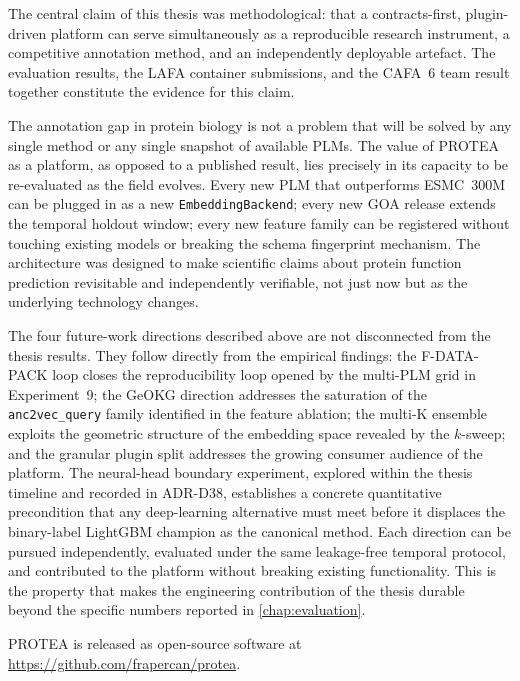The central claim of this thesis was methodological: that a contracts-first,
plugin-driven platform can serve simultaneously as a reproducible research
instrument, a competitive annotation method, and an independently deployable
artefact. The evaluation results, the LAFA container submissions, and the CAFA~6
team result together constitute the evidence for this claim.

The annotation gap in protein biology is not a problem that will be solved by
any single method or any single snapshot of available PLMs. The value of
PROTEA as a platform, as opposed to a published result, lies precisely in its
capacity to be re-evaluated as the field evolves. Every new PLM that outperforms
ESMC~300M can be plugged in as a new \texttt{EmbeddingBackend}; every new GOA
release extends the temporal holdout window; every new feature family can be
registered without touching existing models or breaking the schema fingerprint
mechanism. The architecture was designed to make scientific claims about protein
function prediction revisitable and independently verifiable, not just now but
as the underlying technology changes.

The four future-work directions described above are not disconnected from the
thesis results. They follow directly from the empirical findings: the
F-DATA-PACK loop closes the reproducibility loop opened by the multi-PLM
grid in Experiment~9; the GeOKG direction addresses the saturation of the
\texttt{anc2vec\_query} family identified in the feature ablation; the
multi-K ensemble exploits the geometric structure of the embedding space
revealed by the $k$-sweep; and the granular plugin split addresses the
growing consumer audience of the platform. The neural-head boundary
experiment, explored within the thesis timeline and recorded in ADR-D38,
establishes a concrete quantitative precondition that any deep-learning
alternative must meet before it displaces the binary-label LightGBM champion
as the canonical method. Each direction can be pursued independently,
evaluated under the same leakage-free temporal protocol, and contributed to
the platform without breaking existing functionality. This is the property
that makes the engineering contribution of the thesis durable beyond the
specific numbers reported in \cref{chap:evaluation}.

\bigskip
\noindent PROTEA is released as open-source software at
\url{https://github.com/frapercan/protea}.
